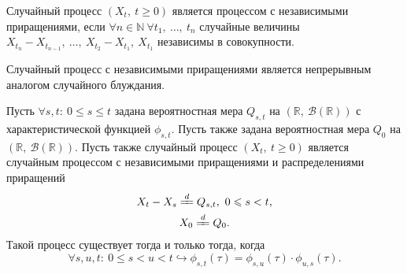 \begin{definition}
Случайный процесс $\displaystyle ( X_{t} ,\ t\geqslant 0)$ является процессом с независимыми приращениями, если $\displaystyle \forall n\in \mathbb{N} \ \forall t_{1} ,\ \dotsc ,\ t_{n}$ случайные величины $\displaystyle X_{t_{n}} -X_{t_{n-1}} ,\ \dotsc ,\ X_{t_{2}} -X_{t_{1}} ,\ X_{t_{1}}$ независимы в совокупности.
\end{definition}
\begin{note}
Случайный процесс с независимыми приращениями является непрерывным аналогом случайного блуждания.
\end{note}
\begin{theorem}\label{4.3} Пусть $\displaystyle \forall s,t:\ 0\leqslant s\leqslant t$ задана вероятностная мера $\displaystyle Q_{s,t}$ на $\displaystyle (\mathbb{R} ,\ \mathcal{B}(\mathbb{R}))$ с характеристической функцией $\displaystyle \phi _{s,t}$. Пусть также задана вероятностная мера $\displaystyle Q_{0}$ на $\displaystyle (\mathbb{R} ,\ \mathcal{B}(\mathbb{R}))$. Пусть также случайный процесс $\displaystyle ( X_{t} ,\ t\geqslant 0)$ является случайным процессом с независимыми приращениями и распределениями приращений
\begin{gather*}
X_{t} -X_{s}\xlongequal{d} Q_{s,t} ,\ 0\leqslant s< t,\\
X_{0}\xlongequal{d} Q_{0} .
\end{gather*}
Такой процесс существует тогда и только тогда, когда
\begin{equation}
\forall s,u,t:\ 0\leqslant s< u< t\hookrightarrow \phi _{s,t}( \tau ) =\phi _{s,u}( \tau ) \cdotp \phi _{u,s}( \tau ) .
\end{equation}
\end{theorem}
